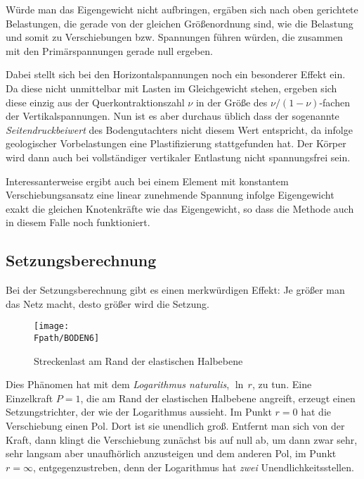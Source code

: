 {{W\"{u}rde man das Eigengewicht nicht aufbringen, erg\"{a}ben sich nach oben gerichtete Belastungen, die gerade von der gleichen Gr\"{o}{\ss}enordnung sind, wie die Belastung und somit zu Verschiebungen bzw. Spannungen f\"{u}hren w\"{u}rden, die zusammen mit den Prim\"{a}rspannungen gerade null ergeben.

Dabei stellt sich bei den Horizontalspannungen noch ein besonderer Effekt ein. Da diese nicht unmittelbar mit Lasten im Gleichgewicht stehen, ergeben sich diese einzig aus der Querkontraktionszahl $\nu$ in der Gr\"{o}{\ss}e des $\nu /(1-\nu)$-fachen der Vertikalspannungen. Nun ist es aber durchaus \"{u}blich dass der sogenannte {\em Seitendruckbeiwert\/} des Bodengutachters nicht diesem Wert entspricht, da infolge geologischer Vorbelastungen eine Plastifizierung stattgefunden hat. Der K\"{o}rper wird dann auch bei vollst\"{a}ndiger vertikaler Entlastung nicht spannungsfrei sein.

Interessanterweise ergibt auch bei einem Element mit konstantem Verschiebungsansatz eine linear zunehmende Spannung infolge Eigengewicht exakt die gleichen Knotenkr\"{a}fte wie das Eigengewicht, so dass die Methode auch in diesem Falle noch funktioniert.

{\textcolor{sectionTitleBlue}{\subsection{Setzungsberechnung}}}\label{Setzungsberechnung}
Bei der Setzungsberechnung gibt es einen merkw\"{u}rdigen Effekt: Je gr\"{o}{\ss}er man das Netz
macht, desto gr\"{o}{\ss}er wird die Setzung.
\begin{figure}[tbp] \centering
\if {} \sidecaption \fi
\texttt{[image: \\Fpath/BODEN6]}
\caption{Streckenlast am Rand der elastischen Halbebene} \label{Boden6}
\end{figure}%

Dies Ph\"{a}nomen hat mit dem {\em Logarithmus naturalis}, $\ln\,r$, zu tun. Eine Einzelkraft $P = 1$, die am Rand der elastischen Halbebene angreift, erzeugt einen Setzungstrichter, der wie der Logarithmus aussieht. Im Punkt $r =0$ hat die Verschiebung einen Pol. Dort ist sie unendlich gro{\ss}. Entfernt man sich von der Kraft, dann klingt die Verschiebung zun\"{a}chst bis auf null ab, um dann zwar sehr, sehr langsam aber unaufh\"{o}rlich anzusteigen und dem anderen Pol, im Punkt $r = \infty$, entgegenzustreben, denn der Logarithmus hat {\em zwei\/} Unendlichkeitsstellen.

}}
